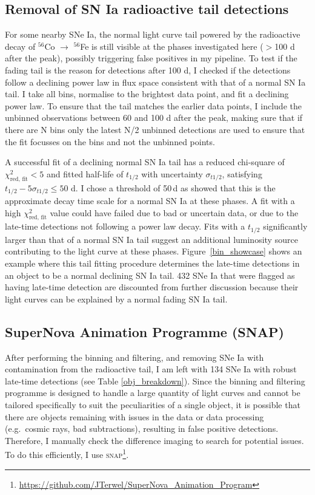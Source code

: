 \documentclass[a4paper,oneside,12pt, class=Latex/Classes/PhDthesisPSnPDF, crop=false]{standalone}
\begin{document}
\subsection{Removal of SN Ia radioactive tail detections}
\label{tail_removal}
For some nearby SNe Ia, the normal light curve tail powered by the radioactive decay of $^{56}$Co $\rightarrow$ $^{56}$Fe is still visible at the phases investigated here ($>$100 d after the peak), possibly triggering false positives in my pipeline. To test if the fading tail is the reason for detections after 100 d, I checked if the detections follow a declining power law in flux space consistent with that of a normal SN Ia tail. I take all bins, normalise to the brightest data point, and fit a declining power law. To ensure that the tail matches the earlier data points, I include the unbinned observations between 60 and 100 d after the peak, making sure that if there are N bins only the latest N/2 unbinned detections are used to ensure that the fit focusses on the bins and not the unbinned points.

A successful fit of a declining normal SN Ia tail has a reduced chi-square of $\chi^2_\text{red, fit} < 5$ and fitted half-life of $t_{1/2}$ with uncertainty $\sigma_{t1/2}$, satisfying $t_{1/2} - 5\sigma_{t1/2} \leq 50$ d. I chose a threshold of 50\,d as \citealt{Georgios_11fe} showed that this is the approximate decay time scale for a normal SN Ia at these phases. A fit with a high $\chi^2_\text{red, fit}$ value could have failed due to bad or uncertain data, or due to the late-time detections not following a power law decay. Fits with a $t_{1/2}$ significantly larger than that of a normal SN Ia tail suggest an additional luminosity source contributing to the light curve at these phases. Figure~\ref{bin_showcase} shows an example where this tail fitting procedure determines the late-time detections in an object to be a normal declining SN Ia tail. 432 SNe Ia that were flagged as having late-time detection are discounted from further discussion because their light curves can be explained by a normal fading SN Ia tail. 


\subsection{SuperNova Animation Programme (SNAP)}
\label{snap}
 After performing the binning and filtering, and removing SNe Ia with contamination from the radioactive tail, I am left with 134 SNe Ia with robust late-time detections (see Table \ref{obj_breakdown}). Since the binning and filtering programme is designed to handle a large quantity of light curves and cannot be tailored specifically to suit the peculiarities of a single object, it is possible that there are objects remaining with issues in the data or data processing (e.g.~cosmic rays, bad subtractions), resulting in false positive detections. Therefore, I manually check the difference imaging to search for potential issues. To do this efficiently, I use \textsc{snap}\footnote{\url{https://github.com/JTerwel/SuperNova_Animation_Program}}.
\end{document}
